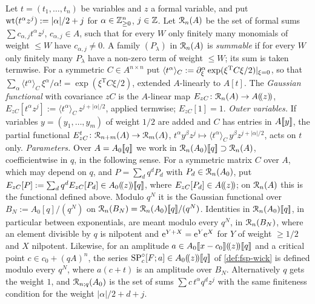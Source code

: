 \begin{defn}
\label{def:fsp-ring}
Let $t=(t_1,\dots,t_n)$ be variables and $z$ a formal variable, and put $\operatorname{wt}(t^\alpha z^j):=|\alpha|/2+j$ for $\alpha\in\mathbb{Z}_{\geq0}^n$, $j\in\mathbb{Z}$. Let $\mathcal{R}_n(A)$ be the set of formal sums $\sum c_{\alpha,j}t^\alpha z^j$, $c_{\alpha,j}\in A$, such that for every $W$ only finitely many monomials of weight $\leq W$ have $c_{\alpha,j}\neq0$. A family $(P_\lambda)$ in $\mathcal{R}_n(A)$ is \emph{summable} if for every $W$ only finitely many $P_\lambda$ have a non-zero term of weight $\leq W$; its sum is taken termwise. For a symmetric $C\in A^{n\times n}$ put $\langle t^\alpha\rangle_C:=\partial_\xi^\alpha\exp(\xi^{\mathrm T}C\xi/2)|_{\xi=0}$, so that $\sum_\alpha\langle t^\alpha\rangle_C\,\xi^\alpha/\alpha!=\exp(\xi^{\mathrm T}C\xi/2)$, extended $A$-linearly to $A[t]$. The \emph{Gaussian functional} with covariance $zC$ is the $A$-linear map $E_{zC}\colon\mathcal{R}_n(A)\to A(\!(z)\!)$, $E_{zC}[t^\alpha z^j]:=\langle t^\alpha\rangle_C\,z^{j+|\alpha|/2}$, applied termwise; $E_{zC}[1]=1$.
\emph{Outer variables.} If variables $y=(y_1,\dots,y_m)$ of weight $1/2$ are added and $C$ has entries in $A[\![ y ]\!]$, the partial functional $E^t_{zC}\colon\mathcal{R}_{n+m}(A)\to\mathcal{R}_m(A)$, $t^\alpha y^\beta z^j\mapsto\langle t^\alpha\rangle_C\,y^\beta z^{j+|\alpha|/2}$, acts on $t$ only.
\emph{Parameters.} Over $A=A_0[\![ q ]\!]$ we work in $\mathcal{R}_n(A_0)[\![ q ]\!]\supset\mathcal{R}_n(A)$, coefficientwise in $q$, in the following sense. For a symmetric matrix $C$ over $A$, which may depend on $q$, and $P=\sum_dq^dP_d$ with $P_d\in\mathcal{R}_n(A_0)$, put $E_{zC}[P]:=\sum_dq^dE_{zC}[P_d]\in A_0(\!(z)\!)[\![ q ]\!]$, where $E_{zC}[P_d]\in A(\!(z)\!)$; on $\mathcal{R}_n(A)$ this is the functional defined above. Modulo $q^N$ it is the Gaussian functional over $B_N:=A_0[q]/(q^N)$ on $\mathcal{R}_n(B_N)=\mathcal{R}_n(A_0)[\![ q ]\!]/(q^N)$. Identities in $\mathcal{R}_n(A_0)[\![ q ]\!]$, in particular between exponentials, are meant modulo every $q^N$, in $\mathcal{R}_n(B_N)$, where an element divisible by $q$ is nilpotent and $\mathrm{e}^{Y+X}=\mathrm{e}^Y\mathrm{e}^X$ for $Y$ of weight $\geq1/2$ and $X$ nilpotent. Likewise, for an amplitude $a\in A_0[\![ x-c_0 ]\!](\!(z)\!)[\![ q ]\!]$ and a critical point $c\in c_0+(qA)^n$, the series $\mathrm{SP}^{\circ}_c[F;a]\in A_0(\!(z)\!)[\![ q ]\!]$ of \cref{def:fsp-wick} is defined modulo every $q^N$, where $a(c+t)$ is an amplitude over $B_N$. Alternatively $q$ gets the weight $1$, and $\mathcal{R}_{n;q}(A_0)$ is the set of sums $\sum c\,t^\alpha q^dz^j$ with the same finiteness condition for the weight $|\alpha|/2+d+j$.
\end{defn}

